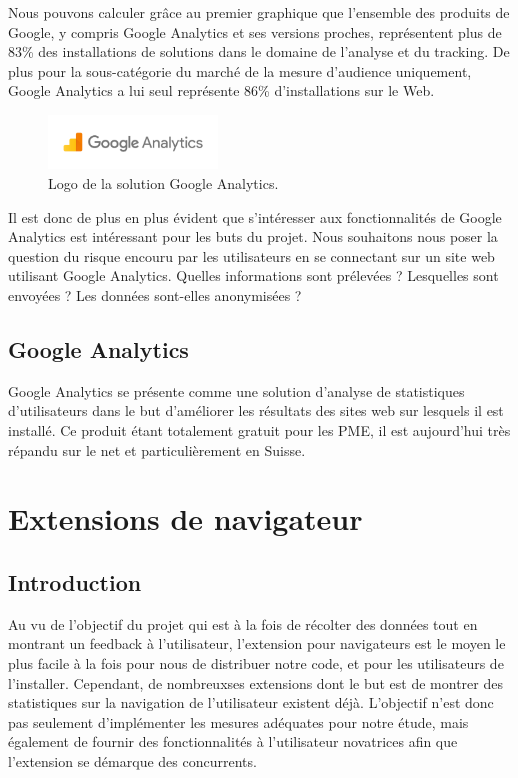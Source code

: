 		Nous pouvons calculer grâce au premier graphique que l'ensemble des produits de Google, y compris Google Analytics et ses versions proches, représentent plus de 83\% des installations de solutions dans le domaine de l'analyse et du tracking. De plus pour la sous-catégorie du marché de la mesure d'audience uniquement, Google Analytics a lui seul représente 86\% d'installations sur le Web.

		\begin{figure}[ht]
			\centering
			\includegraphics[width=0.4\textwidth]{images/analysis/analytics}
			\caption{Logo de la solution Google Analytics\cite{analytics}.}
			\label{a-analytics}
		\end{figure}

		Il est donc de plus en plus évident que s'intéresser aux fonctionnalités de Google Analytics est intéressant pour les buts du projet. Nous souhaitons nous poser la question du risque encouru par les utilisateurs en se connectant sur un site web utilisant Google Analytics. Quelles informations sont prélevées ? Lesquelles sont envoyées ? Les données sont-elles anonymisées ?

	\subsection{Google Analytics}

		Google Analytics se présente comme une solution d'analyse de statistiques d'utilisateurs dans le but d'améliorer les résultats des sites web sur lesquels il est installé. Ce produit étant totalement gratuit pour les PME, il est aujourd'hui très répandu sur le net et particulièrement en Suisse\cite{analytics-usage}.

\section{Extensions de navigateur}

	\subsection{Introduction}

		Au vu de l'objectif du projet qui est à la fois de récolter des données tout en montrant un feedback à l'utilisateur, l'extension pour navigateurs est le moyen le plus facile à la fois pour nous de distribuer notre code, et pour les utilisateurs de l'installer. Cependant, de nombreuxses extensions dont le but est de montrer des statistiques sur la navigation de l'utilisateur existent déjà. L'objectif n'est donc pas seulement d'implémenter les mesures adéquates pour notre étude, mais également de fournir des fonctionnalités à l'utilisateur novatrices afin que l'extension se démarque des concurrents.

